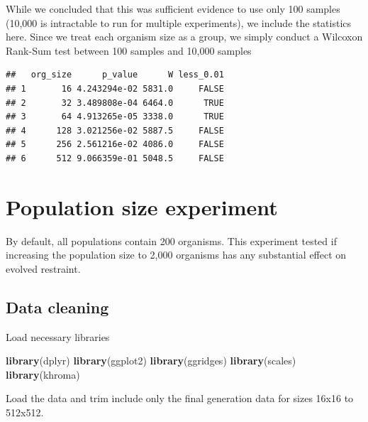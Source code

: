 \documentclass[]{book}
\newenvironment{Shaded}{\begin{snugshade}}{\end{snugshade}}
\newcommand{\KeywordTok}[1]{\textcolor[rgb]{0.13,0.29,0.53}{\textbf{#1}}}
\newcommand{\NormalTok}[1]{#1}
\begin{document}
While we concluded that this was sufficient evidence to use only 100 samples (10,000 is intractable to run for multiple experiments), we include the statistics here.
Since we treat each organism size as a group, we simply conduct a Wilcoxon Rank-Sum test between 100 samples and 10,000 samples

\begin{verbatim}
##   org_size      p_value      W less_0.01
## 1       16 4.243294e-02 5831.0     FALSE
## 2       32 3.489808e-04 6464.0      TRUE
## 3       64 4.913265e-05 3338.0      TRUE
## 4      128 3.021256e-02 5887.5     FALSE
## 5      256 2.561216e-02 4086.0     FALSE
## 6      512 9.066359e-01 5048.5     FALSE
\end{verbatim}

\hypertarget{population-size-experiment}{%
\chapter{Population size experiment}\label{population-size-experiment}}

By default, all populations contain 200 organisms.
This experiment tested if increasing the population size to 2,000 organisms has any substantial effect on evolved restraint.

\hypertarget{data-cleaning-3}{%
\section{Data cleaning}\label{data-cleaning-3}}

Load necessary libraries

\begin{Shaded}
\begin{Highlighting}[]
\KeywordTok{library}\NormalTok{(dplyr)}
\KeywordTok{library}\NormalTok{(ggplot2)}
\KeywordTok{library}\NormalTok{(ggridges)}
\KeywordTok{library}\NormalTok{(scales)}
\KeywordTok{library}\NormalTok{(khroma)}
\end{Highlighting}
\end{Shaded}

Load the data and trim include only the final generation data for sizes 16x16 to 512x512.
\end{document}
